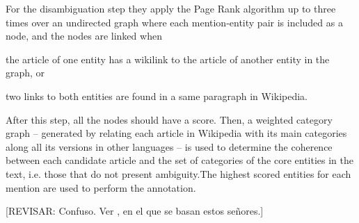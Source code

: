 For the disambiguation step they apply the Page Rank algorithm up to three times over an undirected graph where each mention-entity pair is included as a node, and the nodes are linked when %
\begin{enumerate*}
\item the article of one entity has a wikilink to the article of another entity in the graph, or
\item two links to both entities are found in a same paragraph in Wikipedia.
\end{enumerate*}
%
After this step, all the nodes should have a score. Then, a weighted category graph -- generated by relating each article in Wikipedia with its main categories along all its versions in other languages -- is used to determine the coherence between each candidate article and the set of categories of the core entities in the text, i.e. those that do not present ambiguity.The highest scored entities for each mention are used to perform the annotation. 

{\color{red} [REVISAR: Confuso. Ver \cite{eckhardt2014}, en el que se basan estos señores.]}

\begin{comment}

\noindent\rule{\linewidth}{1px}

\tick\nuevaHerramienta{\cite{ferragina2010,ferragina2012} TagMe/TagMe2}
{2010}
{Wikipedia}
{Prominence + Collective (Microposts)}
{N-grams}
{Dictionary}
{Prominence + Collective agreement between the candidate entities (M\&W). This values are combined through one out of two methods: Disambiguation by classifier (ML), or Disambiguation by Threshold.}

\tick\nuevaHerramienta{\cite{hulpus2013} Kanopy}
{2013}
{DBpedia}
{Collective}
{Stanford CoreNLP}
{Stanford CoreNLP NER + Noun phrase clustering phase}
{Word Sense Disambiguation usin eigenvalues}

\tick\nuevaHerramienta{\cite{liu2013} Liu et al.}
{2013}
{Wikipedia}
{Prominence + Local + Collective (Microposts)}
{-}
{-}
{Ranking with prior, context similarity, co-ocurrence of mentions and M\&W among others.}

\tick\nuevaHerramienta{\cite{scaiella2014} DataTXT (evolution of TagMe)}
{2014}
{Wikipedia}
{Collective (Microposts)}
{-}
{Dictionary}
{Scoring}

\tick\nuevaHerramienta{\cite{sodergren2017} HERD}
{2017}
{Wikipedia + Wikidata}
{Local + Collective (Multilingual)}
{-}
{Dictionary: Solr Text Tagger + Lucene}
{Scoring: PageRank + Category coherence}

\noindent\rule{\linewidth}{1px}

\end{comment}

